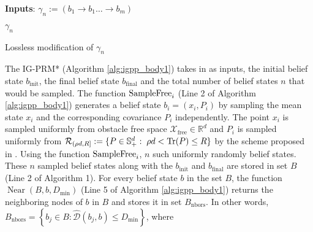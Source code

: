 \documentclass[Afour,sageh,times]{sagej}
\begin{document}
\begin{algorithm}
    { 
     \textbf{Inputs}: $ \gamma_n:=(b_1\rightarrow b_1\dots\rightarrow b_m)$ \;
    
     \Return $\gamma_n$
    }
\caption{Lossless modification of $\gamma_n$}
\label{alg:lossless_modify_ri_prm_star}
\end{algorithm}
The IG-PRM* (Algorithm \ref{alg:igpp_body1}) takes in as inputs, the initial belief state $b_{\text{init}}$, the final belief state $b_{\text{final}}$ and the total number of belief states $n$ that would be sampled. The function $\textup{SampleFree}_i$ (Line 2 of Algorithm \ref{alg:igpp_body1}) generates a belief state $b_i=(x_i,P_i)$ by sampling the mean state $x_i$ and the corresponding covariance $P_i$ independently. The point  
$x_i$ is sampled uniformly from obstacle free space $\mathcal{X}_{\text{free}}\in \mathbb{R}^d$ and $P_i$ is sampled uniformly from $\mathcal{R}_{(\rho d, R ]}:=\{P \in \mathbb{S}^d_{+}:\; \rho d < \textup{Tr}(P) \leq R \}$ by the scheme proposed in \cite{mittelbach2012sampling}.  Using the function $\textup{SampleFree}_i$, $n$ such uniformly randomly belief states. These $n$ sampled belief states along with the $b_{\text{init}}$ and $b_{\text{final}}$ are stored in set $B$ (Line 2 of Algorithm 1). For every belief state $b$ in the set $B$, the function $\operatorname{Near}\left( B, b, D_{\text{min}}\right)$ (Line 5 of Algorithm \ref{alg:igpp_body1}) returns the neighboring nodes of $b$ in $B$ and stores it in set $B_{\text{nbors}}$. In other words,  $B_{\text{nbors}}=\left\{b_j \in B:\hat{\mathcal{D}}(b_j,b)\leq  D_{\text{min}}  \right\}$, 
where 
\end{document}
